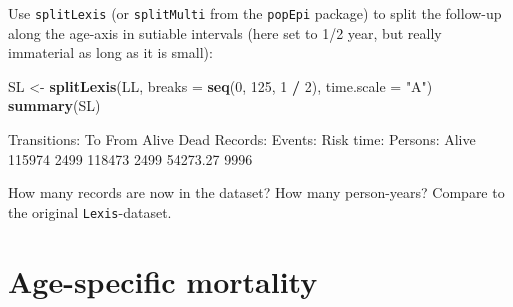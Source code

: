 \documentclass[
]{book}
\newenvironment{Shaded}{\begin{snugshade}}{\end{snugshade}}
\newcommand{\AttributeTok}[1]{\textcolor[rgb]{0.13,0.29,0.53}{#1}}
\newcommand{\DecValTok}[1]{\textcolor[rgb]{0.00,0.00,0.81}{#1}}
\newcommand{\FunctionTok}[1]{\textcolor[rgb]{0.13,0.29,0.53}{\textbf{#1}}}
\newcommand{\NormalTok}[1]{#1}
\newcommand{\OtherTok}[1]{\textcolor[rgb]{0.56,0.35,0.01}{#1}}
\newcommand{\SpecialCharTok}[1]{\textcolor[rgb]{0.81,0.36,0.00}{\textbf{#1}}}
\newcommand{\StringTok}[1]{\textcolor[rgb]{0.31,0.60,0.02}{#1}}
\begin{document}
\begin{enumerate}
  Use \texttt{splitLexis} (or \texttt{splitMulti} from the
  \texttt{popEpi} package) to split the follow-up along the
  age-axis in sutiable intervals (here set to 1/2 year, but really
  immaterial as long as it is small):

\begin{Shaded}
\begin{Highlighting}[]
\NormalTok{SL }\OtherTok{\textless{}{-}} \FunctionTok{splitLexis}\NormalTok{(LL, }
                 \AttributeTok{breaks =} \FunctionTok{seq}\NormalTok{(}\DecValTok{0}\NormalTok{, }\DecValTok{125}\NormalTok{, }\DecValTok{1} \SpecialCharTok{/} \DecValTok{2}\NormalTok{), }
             \AttributeTok{time.scale =} \StringTok{"A"}\NormalTok{)}
\FunctionTok{summary}\NormalTok{(SL)}
\end{Highlighting}
\end{Shaded}

\begin{Shaded}
\begin{Highlighting}[]

\NormalTok{Transitions:}
\NormalTok{     To}
\NormalTok{From     Alive Dead  Records:  Events: Risk time:  Persons:}
\NormalTok{  Alive 115974 2499    118473     2499   54273.27      9996}
\end{Highlighting}
\end{Shaded}

  How many records are now in the dataset? How many person-years?
  Compare to the original \texttt{Lexis}-dataset.
\end{enumerate}

\section{Age-specific mortality}\label{age-specific-mortality}
\end{document}
